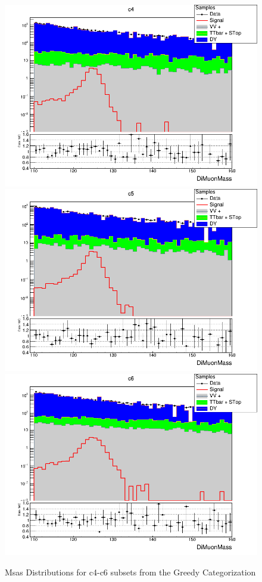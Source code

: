 \begin{figure}[H]
  \centering
  \includegraphics[width=0.65\linewidth]{figures/ch_higgs/distributions/bdt_uf/distribution__c4__DiMuonMass__logY.png}\\
  \includegraphics[width=0.65\linewidth]{figures/ch_higgs/distributions/bdt_uf/distribution__c5__DiMuonMass__logY.png}\\
  \includegraphics[width=0.65\linewidth]{figures/ch_higgs/distributions/bdt_uf/distribution__c6__DiMuonMass__logY.png}
  \caption{Msas Distributions for c4-c6 subsets from the Greedy Categorization}
  \label{fig:higgs_categorization_greedyc4c6}
\end{figure}
